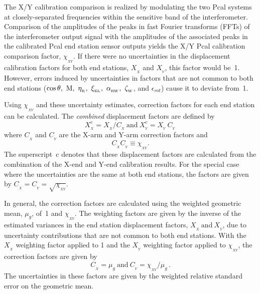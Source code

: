 \documentclass[12pt,a4paper,final]{iopart}
\begin{document}
The X/Y calibration comparison is realized by modulating the two Pcal systems at closely-separated frequencies within the sensitive band of the interferometer.  Comparison of the amplitudes of the peaks in fast Fourier transforms (FFTs) of the interferometer output signal with the amplitudes of the associated peaks in the calibrated  Pcal end station sensor outputs yields the X/Y Pcal calibration comparison factor, $\chi_{_{XY}}$.  If there were no uncertainties in the displacement calibration factors for both end stations, $X_{_{X}}$ and $X_{_{Y}}$, this factor would be~1.  However, errors induced by uncertainties in factors that are not common to both end stations ($\rm cos\,\theta, \ M, \ \eta_{_{R}}, \ \xi_{_{EL}}, \ \alpha_{_{RW}},\ \zeta_{_{W}}$, and $\epsilon_{rot}$) cause it to deviate from~1.

Using $\chi_{_{XY}}$ and these uncertainty estimates, correction factors for each end station can be calculated.
The {\em combined} displacement factors are defined by
\begin{equation}
\label{eq:disp_coeffXY}
    X^c_{_X}  = X_{_{X}} / C_{_X}  \ \textrm{and} \  X^c_{_Y}  = X_{_{Y}}  \  C_{_Y} \,
\end{equation}
where $C_{_X}$ and $C_{_Y}$ are the X-arm and Y-arm correction factors and 
%
\begin{equation}
  C_{_X} C_{_Y} \equiv  \chi_{_{XY}}.
\end{equation}
%
The superscript~c denotes that these displacement factors are calculated from the combination of the X-end and Y-end calibration results.  For the special case where the uncertainties are the same at both end stations, the factors are given by
$C_{_X} = C_{_Y} = \sqrt{\chi_{_{XY}}}$.

In general, the correction factors are calculated using the weighted geometric mean, $\mu_g$, of~1 and $\chi_{_{XY}}$. The weighting factors are given by the inverse of the estimated variances in the end station displacement factors, $X_{_{X}}  \ \textrm{and} \ X_{_{Y}}$, due to uncertainty contributions that are not common to both end stations.  With the $X_{_X}$ weighting factor applied to 1 and the $X_{_Y}$ weighting factor applied to $\chi_{_{XY}}$, the correction factors are given by
%
\begin{equation}
\label{eq:corr_fact}
    C_{_X} = \mu_g \ \textrm{and} \ C_{_Y} = \chi_{_{XY}} / \mu_g\,.
\end{equation}
%
The uncertainties in these factors are given by the weighted relative standard error on the geometric mean.
%
\end{document}

